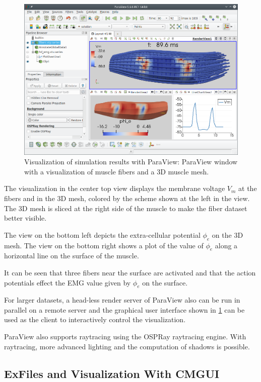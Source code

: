 \begin{figure}%
  \centering%
  \includegraphics[width=\textwidth]{images/implementation/paraview.png}%
  \caption{Visualization of simulation results with ParaView: ParaView window with a visualization of muscle fibers and a 3D muscle mesh.}%
  \label{fig:paraview_output}%
\end{figure}%

The visualization in the center top view displays the membrane voltage $V_m$ at the fibers and in the 3D mesh, colored by the scheme shown at the left in the view. The 3D mesh is sliced at the right side of the muscle to make the fiber dataset better visible.

The view on the bottom left depicts the extra-cellular potential $\phi_e$ on the 3D mesh. The view on the bottom right shows a plot of the value of $\phi_e$ along a horizontal line on the surface of the muscle.

It can be seen that three fibers near the surface are activated and that the action potentials effect the EMG value given by $\phi_e$ on the surface.

For larger datasets, a head-less render server of ParaView also can be run in parallel on a remote server and the graphical user interface shown in \cref{fig:paraview_output} can be used as the client to interactively control the visualization.

ParaView also supports raytracing using the OSPRay raytracing engine. With raytracing, more advanced lighting and the computation of shadows is possible.

\subsection{ExFiles and Visualization With CMGUI}


